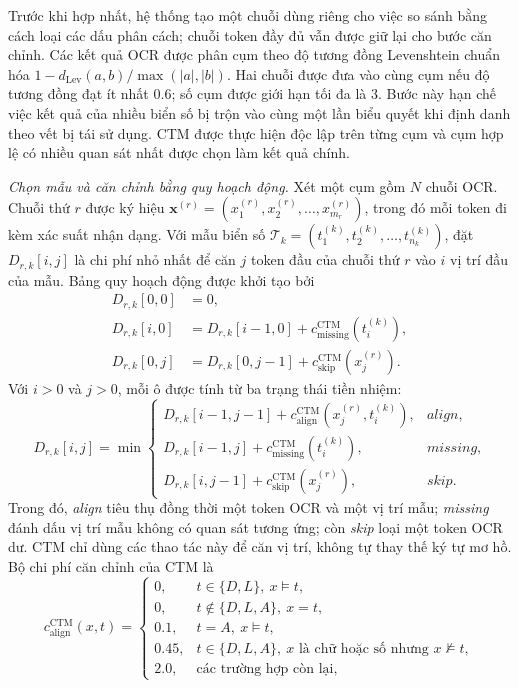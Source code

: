 \documentclass[../DoAn.tex]{subfiles}
\begin{document}
Trước khi hợp nhất, hệ thống tạo một chuỗi dùng riêng cho
việc so sánh bằng cách loại các dấu phân cách; chuỗi token đầy đủ vẫn được giữ
lại cho bước căn chỉnh. Các kết quả OCR được phân cụm theo độ tương đồng
Levenshtein chuẩn hóa
$1-d_{\mathrm{Lev}}(a,b)/\max(|a|,|b|)$. Hai chuỗi được đưa vào cùng cụm nếu
độ tương đồng đạt ít nhất $0.6$; số cụm được giới hạn tối đa là 3. Bước này hạn
chế việc kết quả của nhiều biển số bị trộn vào cùng một lần biểu quyết khi định
danh theo vết bị tái sử dụng. CTM được thực hiện độc lập trên từng cụm và cụm
hợp lệ có nhiều quan sát nhất được chọn làm kết quả chính.

\textit{Chọn mẫu và căn chỉnh bằng quy hoạch động.}
Xét một cụm gồm $N$ chuỗi OCR. Chuỗi thứ $r$ được ký hiệu
$\mathbf{x}^{(r)}=(x^{(r)}_1,x^{(r)}_2,\ldots,x^{(r)}_{m_r})$, trong đó mỗi
token đi kèm xác suất nhận dạng. Với mẫu biển số
$\mathcal{T}_k=(t^{(k)}_1,t^{(k)}_2,\ldots,t^{(k)}_{n_k})$, đặt
$D_{r,k}[i,j]$ là chi phí nhỏ nhất để căn $j$ token đầu của chuỗi thứ $r$ vào
$i$ vị trí đầu của mẫu. Bảng quy hoạch động được khởi tạo bởi
\begin{equation}
\begin{aligned}
D_{r,k}[0,0]&=0,\\
D_{r,k}[i,0]&=D_{r,k}[i-1,0]+c^{\mathrm{CTM}}_{\mathrm{missing}}
    (t^{(k)}_i),\\
D_{r,k}[0,j]&=D_{r,k}[0,j-1]+c^{\mathrm{CTM}}_{\mathrm{skip}}
    (x^{(r)}_j).
\end{aligned}
\end{equation}
Với $i>0$ và $j>0$, mỗi ô được tính từ ba trạng thái tiền nhiệm:
\begin{equation}
D_{r,k}[i,j]=\min
\begin{cases}
D_{r,k}[i-1,j-1]+c^{\mathrm{CTM}}_{\mathrm{align}}
    (x^{(r)}_j,t^{(k)}_i), & \textit{align},\\
D_{r,k}[i-1,j]+c^{\mathrm{CTM}}_{\mathrm{missing}}
    (t^{(k)}_i), & \textit{missing},\\
D_{r,k}[i,j-1]+c^{\mathrm{CTM}}_{\mathrm{skip}}
    (x^{(r)}_j), & \textit{skip}.
\end{cases}
\label{eq:ctm-dp-recurrence}
\end{equation}
Trong đó, \textit{align} tiêu thụ đồng thời một token OCR và một vị trí mẫu;
\textit{missing} đánh dấu vị trí mẫu không có quan sát tương ứng; còn
\textit{skip} loại một token OCR dư. CTM chỉ dùng các thao tác này để căn vị
trí, không tự thay thế ký tự mơ hồ. Bộ chi phí căn chỉnh của CTM là
\begin{equation}
c^{\mathrm{CTM}}_{\mathrm{align}}(x,t)=
\begin{cases}
0, & t\in\{D,L\},\ x\models t,\\
0, & t\notin\{D,L,A\},\ x=t,\\
0.1, & t=A,\ x\models t,\\
0.45, & t\in\{D,L,A\},\ x\text{ là chữ hoặc số nhưng }x\not\models t,\\
2.0, & \text{các trường hợp còn lại},
\end{cases}
\label{eq:ctm-align-cost}
\end{equation}
\end{document}
